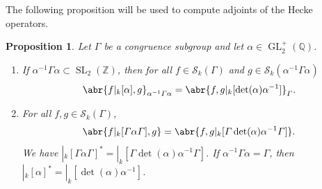 \documentclass[10pt,leqno,twoside]{article}
\theoremstyle{plain}
\newtheorem{proposition}[lem]{Proposition}
\theoremstyle{definition}
\numberwithin{equation}{section}
\numberwithin{lem}{section}
\DeclareMathOperator{\GL}{GL}
\DeclareMathOperator{\SL}{SL}
\newcommand{\slz}{\SL_2(\mathbb{Z})}
\newcommand{\glqp}{\GL_2^+(\mathbb{Q})}
\begin{document}
The following proposition will be used to compute adjoints of the Hecke operators.
\begin{proposition}\label{prop: computing adjoints}
    Let $\varGamma$ be a congruence subgroup and let $\alpha\in\glqp$. \begin{enumerate}[label = \textup{(\arabic*)}]
        \item If $\alpha^{-1}\varGamma\alpha\subset \slz$, then for all $f\in\mathcal S_k(\varGamma)$ and $g\in\mathcal S_k(\alpha^{-1}\varGamma\alpha)$ \[\abr{f|_k[\alpha],g}_{\alpha^{-1}\varGamma\alpha} = \abr{f,g|_k[\det(\alpha)\alpha^{-1}]}_\varGamma.\]
        \item For all $f,g\in\mathcal S_k(\varGamma)$, \[\abr{f|_k[\varGamma\alpha\varGamma],g}  = \abr{f,g|_k[\varGamma\det(\alpha)\alpha^{-1}\varGamma]}.\]
        We have $|_k[\varGamma\alpha\varGamma]^\ast = |_k[\varGamma\det(\alpha)\alpha^{-1}\varGamma]$. If $\alpha^{-1}\varGamma\alpha = \varGamma$, then $|_k[\alpha]^\ast = |_k[\det(\alpha)\alpha^{-1}]$.
    \end{enumerate}
\end{proposition}
\end{document}
